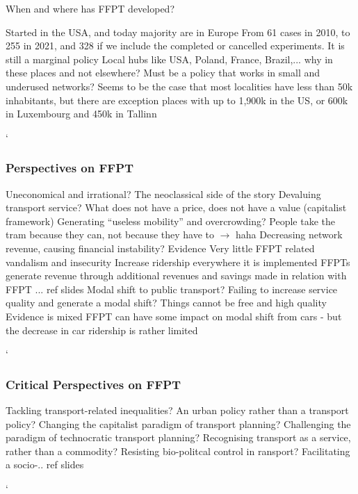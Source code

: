 \documentclass{article}
\begin{document}
When and where has FFPT developed?

\begin{outline}
	\1 Started in the USA, and today majority are in Europe
	\1 From 61 cases in 2010, to 255 in 2021, and 328 if we include the completed or cancelled experiments. It is still a marginal policy
	\1 Local hubs like USA, Poland, France, Brazil,... why in these places and not elsewhere?
	\1 Must be a policy that works in small and underused networks? Seems to be the case that most localities have less than 50k inhabitants, but there are exception places with up to 1,900k in the US, or 600k in Luxembourg and 450k in Tallinn
\end{outline}`

\subsubsection{Perspectives on FFPT}

\begin{outline}
	\1 Uneconomical and irrational? The neoclassical side of the story
		\2 Devaluing transport service? What does not have a price, does not have a value (capitalist framework)
		\2 Generating ``useless mobility'' and overcrowding? People take the tram because they can, not because they have to $\rightarrow$  haha
		\2 Decreasing network revenue, causing financial instability?
		\2 Evidence
			\3 Very little FFPT related vandalism and insecurity
			\3 Increase ridership everywhere it is implemented
			\3 FFPTs generate revenue through additional revenues and savings made in relation with FFPT
			\3 ... ref slides
	\1 Modal shift to public transport?
		\2 Failing to increase service quality and generate a modal shift? Things cannot be free and high quality
		\2 Evidence is mixed
			\3 FFPT can have some impact on modal shift from cars - but the decrease in car ridership is rather limited
\end{outline}`


\subsubsection{Critical Perspectives on FFPT}

\begin{outline}
	\1 Tackling transport-related inequalities?
	\1 An urban policy rather than a transport policy?
		\2 Changing the capitalist paradigm of transport planning? 
			\3 Challenging the paradigm of technocratic transport planning?
			\3 Recognising transport as a service, rather than a commodity?
			\3 Resisting bio-politcal control in ransport?
		\2 Facilitating a socio-.. ref slides
\end{outline}`
\end{document}
